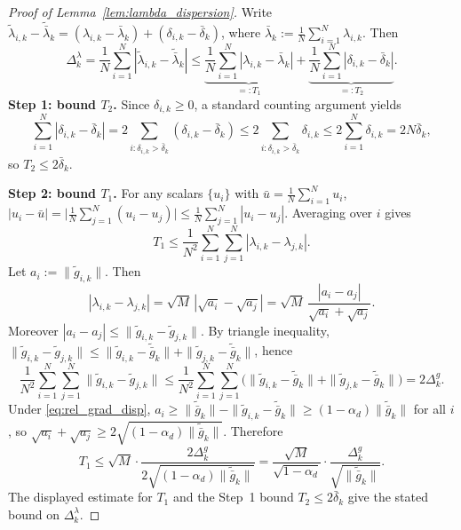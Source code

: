 \documentclass[review,onefignum,onetabnum]{siamart171218}
\begin{document}
	\begin{proof}[Proof of Lemma~\ref{lem:lambda_dispersion}]
		Write $\tilde\lambda_{i,k}-\tilde{\bar\lambda}_k=(\lambda_{i,k}-\bar\lambda_k)+(\delta_{i,k}-\bar\delta_k)$,
		where $\bar\lambda_k:=\frac1N\sum_{i=1}^N\lambda_{i,k}$.
		Then
		\[
		\Delta_k^\lambda
		=\frac1N\sum_{i=1}^N|\tilde\lambda_{i,k}-\tilde{\bar\lambda}_k|
		\le \underbrace{\frac1N\sum_{i=1}^N|\lambda_{i,k}-\bar\lambda_k|}_{=:T_1}
		+\underbrace{\frac1N\sum_{i=1}^N|\delta_{i,k}-\bar\delta_k|}_{=:T_2}.
		\]
		\textbf{Step 1: bound $T_2$.}
		Since $\delta_{i,k}\ge0$, a standard counting argument yields
		\[
		\sum_{i=1}^N|\delta_{i,k}-\bar\delta_k|
		=2\sum_{i:\delta_{i,k}>\bar\delta_k}(\delta_{i,k}-\bar\delta_k)
		\le 2\sum_{i:\delta_{i,k}>\bar\delta_k}\delta_{i,k}
		\le 2\sum_{i=1}^N\delta_{i,k}=2N\bar\delta_k,
		\]
		so $T_2\le 2\bar\delta_k$.
		
		\textbf{Step 2: bound $T_1$.}
		For any scalars $\{u_i\}$ with $\bar u=\frac1N\sum_{i=1}^N u_i$,
		$|u_i-\bar u|=\big|\frac1N\sum_{j=1}^N(u_i-u_j)\big|\le \frac1N\sum_{j=1}^N|u_i-u_j|$.
		Averaging over $i$ gives
		\[
		T_1\le \frac{1}{N^2}\sum_{i=1}^N\sum_{j=1}^N|\lambda_{i,k}-\lambda_{j,k}|.
		\]
		Let $a_i:=\|\tilde g_{i,k}\|$. Then
		\[
		|\lambda_{i,k}-\lambda_{j,k}|
		=\sqrt{M}\,|\sqrt{a_i}-\sqrt{a_j}|
		=\sqrt{M}\,\frac{|a_i-a_j|}{\sqrt{a_i}+\sqrt{a_j}}.
		\]
		Moreover $|a_i-a_j|\le \|\tilde g_{i,k}-\tilde g_{j,k}\|$.
		By triangle inequality,
		$\|\tilde g_{i,k}-\tilde g_{j,k}\|\le \|\tilde g_{i,k}-\tilde{\bar g}_k\|+\|\tilde g_{j,k}-\tilde{\bar g}_k\|$,
		hence
		\[
		\frac1{N^2}\sum_{i=1}^N\sum_{j=1}^N\|\tilde g_{i,k}-\tilde g_{j,k}\|
		\le \frac1{N^2}\sum_{i=1}^N\sum_{j=1}^N\big(\|\tilde g_{i,k}-\tilde{\bar g}_k\|+\|\tilde g_{j,k}-\tilde{\bar g}_k\|\big)
		=2\Delta_k^g.
		\]
		Under \eqref{eq:rel_grad_disp}, $a_i\ge \|\tilde{\bar g}_k\|-\|\tilde g_{i,k}-\tilde{\bar g}_k\|\ge (1-\alpha_d)\|\tilde{\bar g}_k\|$ for all $i$,
		so $\sqrt{a_i}+\sqrt{a_j}\ge 2\sqrt{(1-\alpha_d)\|\tilde{\bar g}_k\|}$.
		Therefore
		\[
		T_1\le \sqrt{M}\cdot \frac{2\Delta_k^g}{2\sqrt{(1-\alpha_d)\|\tilde{\bar g}_k\|}}
		=\frac{\sqrt{M}}{\sqrt{1-\alpha_d}}\cdot \frac{\Delta_k^g}{\sqrt{\|\tilde{\bar g}_k\|}}.
		\]
		The displayed estimate for $T_1$ and the Step~1 bound
		$T_2\le 2\bar\delta_k$ give the stated bound on
		$\Delta_k^\lambda$.
	\end{proof}
	
\end{document}
